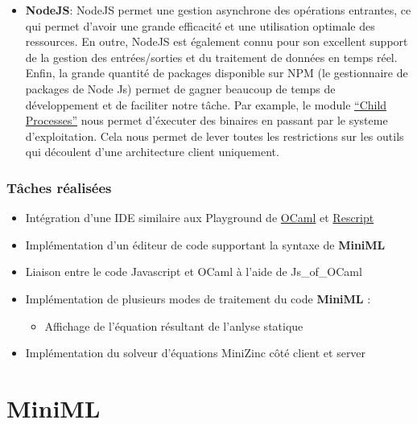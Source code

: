 \documentclass[
  12pt,
]{article}
\providecommand{\tightlist}{%
  \setlength{\itemsep}{0pt}\setlength{\parskip}{0pt}}
\begin{document}
\begin{itemize}
\tightlist
\item
  \textbf{NodeJS}: NodeJS permet une gestion asynchrone des opérations
  entrantes, ce qui permet d'avoir une grande efficacité et une
  utilisation optimale des ressources. En outre, NodeJS est également
  connu pour son excellent support de la gestion des entrées/sorties et
  du traitement de données en temps réel. Enfin, la grande quantité de
  packages disponible sur NPM (le gestionnaire de packages de Node Js)
  permet de gagner beaucoup de temps de développement et de faciliter
  notre tâche. Par example, le module
  \href{https://nodejs.org/api/child_process.html}{``Child Processes''}
  nous permet d'éxecuter des binaires en passant par le systeme
  d'exploitation. Cela nous permet de lever toutes les restrictions sur
  les outils qui découlent d'une architecture client uniquement.
\end{itemize}

\hypertarget{tuxe2ches-ruxe9alisuxe9es-1}{%
\subsubsection{Tâches réalisées}\label{tuxe2ches-ruxe9alisuxe9es-1}}

\begin{itemize}
\tightlist
\item
  Intégration d'une IDE similaire aux Playground de
  \href{https://OCaml.org/play}{OCaml} et
  \href{https://rescript-lang.org/try}{Rescript}
\item
  Implémentation d'un éditeur de code supportant la syntaxe de
  \textbf{MiniML}
\item
  Liaison entre le code Javascript et OCaml à l'aide de Js\_of\_OCaml
\item
  Implémentation de plusieurs modes de traitement du code
  \textbf{MiniML} :

  \begin{itemize}
  \tightlist
  \item
    Affichage de l'équation résultant de l'anlyse statique
  \end{itemize}
\item
  Implémentation du solveur d'équations MiniZinc côté client et server
\end{itemize}

\hypertarget{miniml}{%
\section{MiniML}\label{miniml}}
\end{document}
